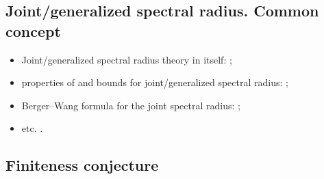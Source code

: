 \documentclass[a4paper,fleqn]{article}
\let\cite=\citep
\begin{document}
\subsection*{Joint/generalized spectral radius. Common concept}
\begin{itemize}
\item Joint/generalized spectral radius theory in itself: \cite{AhmPar:CDC12, Bar:CDC05, BKPW:LAA08, Blondel:LAA08, Bochi15, Breuillard2022, Cicone:ArXiv15, CMS:LAA21, CMMS:EJP23, Czornik:LAA05, Els:LAA95, GugZen:LNM14, Jungers:09, Jungers:LNCS13, Morris:LAA17, MorSid:JEMS13, OgurMart:LAA14, PW:LAA08, PWB:CDC05, Prot:FPM96:e, Prot:IZV97:e, Prot:FU98, RotaStr:IM60, RotaStr:IMP60, ShihWP:LAA97, ShulTur:JFA00, KisShulTur:20, KisShulTur:JMS22, ShulTur:ArXiv08, Strang03, Theys:PhD05, XuXiao:AJIFAC11, MolReif:LAA14, Moeller15, MP:DCDCA18};
\item properties of and bounds for joint/generalized spectral radius: \cite{Alpin:MZ10, Breuillard2022, CJ:IJAMCS06, CJN:AISC15, Gil:UJMA19, GugProt:MC23, GS:MCRF20, HStr:LASP92, Koz:DEDS10, Koz:LAA10, Maesumi:TIC95, Maesumi:LAA96, Morris:ADVM10, Peperko:LAA12, Wirth:MTNS04, Wirth:LAA05, XuAci:IEEETAC20, Zhou:AMC06};
\item Berger--Wang formula for the joint spectral radius: \cite{BF:AIF21, Breuillard2022, Koz:LAA14, Morris:JFA12, Oregon-Reyes:JEPM20};
\item etc. \cite{Bui:LAA22, GugZen:LAA12, Koz:LAA09, Oreg-Reyes:MastThes18, Pascoe:IJM21}.
\end{itemize}

\subsection*{Finiteness conjecture}
\end{document}
